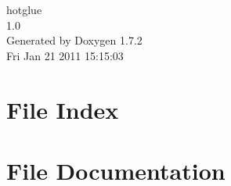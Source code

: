 \documentclass[a4paper]{book}
\begin{document}
\hypersetup{pageanchor=false}
\begin{titlepage}
\vspace*{7cm}
\begin{center}
{\Large hotglue \\[1ex]\large 1.0 }\\
\vspace*{1cm}
{\large Generated by Doxygen 1.7.2}\\
\vspace*{0.5cm}
{\small Fri Jan 21 2011 15:15:03}\\
\end{center}
\end{titlepage}
\clearemptydoublepage
{}
\tableofcontents
\clearemptydoublepage
{}
\hypersetup{pageanchor=true}
\chapter{File Index}

\chapter{File Documentation}






















\printindex
\end{document}
